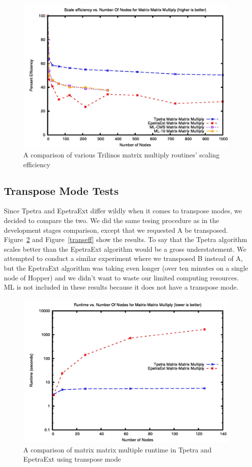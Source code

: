 \documentclass{article}
\begin{document}
\begin{figure}
\includegraphics[scale=.4]{totaleff.jpg}
\caption[Efficiency Comparison]{A comparison of various Trilinos matrix multiply routines' scaling efficiency}
\label{totaleff}
\end{figure}

\subsection{Transpose Mode Tests}
Since Tpetra and EpetraExt differ wildly when it comes to transpose modes, we decided to compare the two. We did the same
tesing procedure as in the development stages comparison, except that we requested A be transposed. Figure~\ref{transtime}
and Figure~\ref{transeff} show the results. To say that the Tpetra algorithm scales better than the EpetraExt algorithm
would be a gross understatement. We attempted to conduct a similar experiment where we transposed B instead of A, 
but the EpetraExt algorithm was taking even longer (over ten minutes on a single node of Hopper) and we didn't want to 
waste our limited computing resources. ML is not included in these results because it does not have a transpose mode.

\begin{figure}
\includegraphics[scale=.4]{atranstime.jpg}
\caption[Time Comparison]{A comparison of matrix matrix multiple runtime in Tpetra and EpetraExt using transpose mode}
\label{transtime}
\end{figure}
\end{document}
